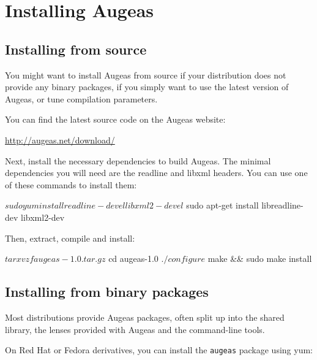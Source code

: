 \chapter{Installing Augeas}

\label{chap:installing_augeas} 

\section{Installing from source}

\label{sec:installing_from_source}

You might want to install Augeas from source if your distribution does not provide any binary packages, if you simply want to use the latest version of Augeas, or tune compilation parameters.

You can find the latest source code on the Augeas website:

	\url{http://augeas.net/download/}

Next, install the necessary dependencies to build Augeas. The minimal dependencies you will need are the readline and libxml headers. You can use one of these commands to install them:

\begin{console}[]
$ sudo yum install readline-devel libxml2-devel
$ sudo apt-get install libreadline-dev libxml2-dev
\end{console}

Then, extract, compile and install:

\begin{console}[]
$ tar xvzf augeas-1.0.tar.gz
$ cd augeas-1.0
$ ./configure
$ make && sudo make install
\end{console}



\section{Installing from binary packages}


\label{sec:installing_from_packages}

Most distributions provide Augeas packages, often split up into the shared library, the lenses provided with Augeas and the command-line tools.

On Red Hat or Fedora derivatives, you can install the \verb!augeas! package using yum:

